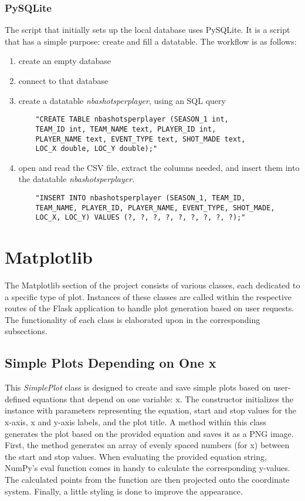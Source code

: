 \documentclass[sn-mathphys-num]{sn-jnl}%
\theoremstyle{thmstyleone}%
\theoremstyle{thmstyletwo}%
\theoremstyle{thmstylethree}%
\begin{document}
\subsubsection{PySQLite}\label{subsubsubsec2}

The script that initially sets up the local database uses PySQLite. It is a script that has a simple purpose: create and fill a datatable. The workflow is as follows:
\begin{enumerate}
    \item create an empty database
    \item connect to that database
    \item create a datatable \textit{nbashotsperplayer}, using an SQL query
    \begin{verbatim}
    "CREATE TABLE nbashotsperplayer (SEASON_1 int,
    TEAM_ID int, TEAM_NAME text, PLAYER_ID int,
    PLAYER_NAME text, EVENT_TYPE text, SHOT_MADE text,
    LOC_X double, LOC_Y double);"
\end{verbatim}
    \item open and read the CSV file, extract the columns needed, and insert them into the datatable \textit{nbashotsperplayer}.
\begin{verbatim}
    "INSERT INTO nbashotsperplayer (SEASON_1, TEAM_ID,
    TEAM_NAME, PLAYER_ID, PLAYER_NAME, EVENT_TYPE, SHOT_MADE,
    LOC_X, LOC_Y) VALUES (?, ?, ?, ?, ?, ?, ?, ?, ?);"
\end{verbatim}
\end{enumerate}

\section{Matplotlib}\label{sec4}

The Matplotlib section of the project consists of various classes, each dedicated to a specific type of plot. Instances of these classes are called within the respective routes of the Flask application to handle plot generation based on user requests. The functionality of each class is elaborated upon in the corresponding subsections.

\subsection{Simple Plots Depending on One x}\label{subsec1}

This \textit{SimplePlot} class is designed to create and save simple plots based on user-defined equations that depend on one variable: x. The constructor initializes the instance with parameters representing the equation, start and stop values for the x-axis, x and y-axis labels, and the plot title.
A method within this class generates the plot based on the provided equation and saves it as a PNG image.
First, the method generates an array of evenly spaced numbers (for x) between the start and stop values. When evaluating the provided equation string, NumPy's eval function comes in handy to calculate the corresponding y-values. The calculated points from the function are then projected onto the coordinate system. Finally, a little styling is done to improve the appearance.
\end{document}
